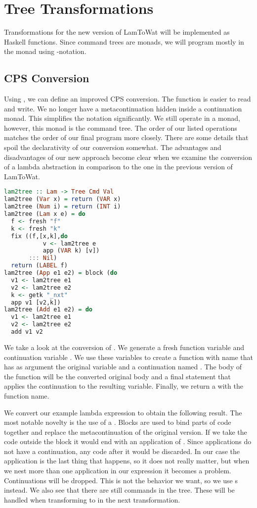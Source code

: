 \section{\label{section:treensforms}Tree Transformations}
Transformations for the new version of LamToWat will be implemented as Haskell functions. Since command trees are monads, we will program mostly in the monad using -notation. 

\subsection{\label{subsection:cpsconvert2}CPS Conversion}
Using , we can define an improved CPS conversion. The function is easier to read and write. We no longer have a metacontinuation hidden inside a continuation monad. This simplifies the notation significantly. We still operate in a monad, however, this monad is the command tree. The order of our listed operations matches the order of our final program more closely. There are some details that spoil the declarativity of our conversion somewhat. The advantages and disadvantages of our new approach become clear when we examine the conversion of a lambda abstraction in comparison to the one in the previous version of LamToWat.

\begin{lstlisting}[language=Haskell]
lam2tree :: Lam -> Tree Cmd Val
lam2tree (Var x) = return (VAR x)
lam2tree (Num i) = return (INT i)
lam2tree (Lam x e) = do
  f <- fresh "f"
  k <- fresh "k"
  fix ((f,[x,k],do
           v <- lam2tree e
           app (VAR k) [v])
       ::: Nil)
  return (LABEL f)
lam2tree (App e1 e2) = block (do
  v1 <- lam2tree e1
  v2 <- lam2tree e2
  k <- getk "_nxt"
  app v1 [v2,k])
lam2tree (Add e1 e2) = do
  v1 <- lam2tree e1
  v2 <- lam2tree e2
  add v1 v2
\end{lstlisting}

We take a look at the conversion of . We generate a fresh function variable  and continuation variable . We use these variables to create a function with name  that has as argument the original variable and a continuation named . The body of the function will be the converted original body and a final statement that applies the continuation to the resulting variable. Finally, we return a  with the function name.

We convert our example lambda expression  to obtain the following result. The most notable novelty is the use of a . Blocks are used to bind parts of code together and replace the metacontinuation of the original version. If we take the code outside the block it would end with an application of . Since applications do not have a continuation, any code after it would be discarded. In our case the application is the last thing that happens, so it does not really matter, but when we nest more than one application in our expression it becomes a problem. Continuations will be dropped. This is not the behavior we want, so we use s instead. We also see that there are still  commands in the tree. These will be handled when transforming to  in the next transformation.

